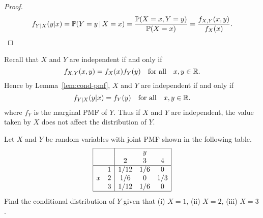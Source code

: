 \begin{proof}
\[
f_{Y|X}(y|x) = \mathbb{P}(Y=y\,|\,X=x) = \frac{\mathbb{P}(X=x,Y=y)}{\mathbb{P}(X=x)} = \frac{f_{X,Y}(x,y)}{f_X(x)}.
\]
\end{proof}

\begin{remark}[Independence]
Recall that $X$ and $Y$ are independent if and only if 
\[
f_{X,Y}(x,y)=f_X(x)f_Y(y) \quad\text{for all}\quad x,y\in\mathbb{R}.
\]
Hence by Lemma~\ref{lem:cond-pmf}, $X$ and $Y$ are independent if and only if 
\[
f_{Y|X}(y|x) = f_Y(y) \quad\text{for all}\quad x,y\in\mathbb{R}.
\]
where $f_Y$ is the marginal PMF of $Y$. Thus if $X$ and $Y$ are independent, the value taken by $X$ does not affect the distribution of $Y$.
\end{remark}


\begin{example}\label{ex:cond-dist-tedious}
Let $X$ and $Y$ be random variables with joint PMF shown in the following table. 
\[
\begin{array}{|cc|ccc|}\hline
	&       &       & y     &   \\
    &       & 2     & 3     & 4 \\ \hline
	& 1		& 1/12	& 1/6	& 0 		\\ 
x	& 2		& 1/6	& 0		& 1/3 	\\ 
	& 3		& 1/12	& 1/6  	& 0		\\ \hline
\end{array}
\]
Find the conditional distribution of $Y$ given that (i) $X=1$, (ii) $X=2$, (iii) $X=3$.
\end{example}

